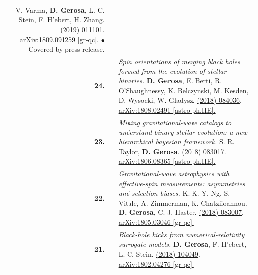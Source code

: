 {\begin{longtable}{rp{0.3cm}p{15.8cm}}
\newline{}
V. Varma, \textbf{D. Gerosa}, L. C. Stein, F. H'ebert, H. Zhang.
\newline{}
\href{https://journals.aps.org/prl/abstract/10.1103/PhysRevLett.122.011101}{\prl 122 (2019) 011101}. \href{https://arxiv.org/abs/1809.091259}{arXiv:1809.091259 [gr-qc].}
\newline{}
\textcolor{color1}{$\bullet$} Covered by press release.
\vspace{0.09cm}\\
%
\textbf{24.} & & \textit{Spin orientations of merging black holes formed from the evolution of stellar binaries.}
\newline{}
\textbf{D. Gerosa}, E. Berti, R. O'Shaughnessy, K. Belczynski, M. Kesden, D. Wysocki, W. Gladysz.
\newline{}
\href{https://journals.aps.org/prd/abstract/10.1103/PhysRevD.98.084036}{\prd 98 (2018) 084036}. \href{https://arxiv.org/abs/1808.02491}{arXiv:1808.02491 [astro-ph.HE].}
\vspace{0.09cm}\\
%
\textbf{23.} & & \textit{Mining gravitational-wave catalogs to understand binary stellar evolution: a new hierarchical bayesian framework.}
\newline{}
S. R. Taylor, \textbf{D. Gerosa}.
\newline{}
\href{https://journals.aps.org/prd/abstract/10.1103/PhysRevD.98.083017}{\prd 98 (2018) 083017}. \href{https://arxiv.org/abs/1806.08365}{arXiv:1806.08365 [astro-ph.HE].}
\vspace{0.09cm}\\
%
\textbf{22.} & & \textit{Gravitational-wave astrophysics with effective-spin measurements: asymmetries and selection biases.}
\newline{}
K. K. Y. Ng, S. Vitale, A. Zimmerman, K. Chatziioannou, \textbf{D. Gerosa}, C.-J. Haster.
\newline{}
\href{https://journals.aps.org/prd/abstract/10.1103/PhysRevD.98.083007}{\prd 98 (2018) 083007}. \href{https://arxiv.org/abs/1805.03046}{arXiv:1805.03046 [gr-qc].}
\vspace{0.09cm}\\
%
\textbf{21.} & & \textit{Black-hole kicks from numerical-relativity surrogate models.}
\newline{}
\textbf{D. Gerosa}, F. H'ebert, L. C. Stein.
\newline{}
\href{https://journals.aps.org/prd/abstract/10.1103/PhysRevD.97.104049}{\prd 97 (2018) 104049}. \href{https://arxiv.org/abs/1802.04276}{arXiv:1802.04276 [gr-qc].}

\end{longtable}}
